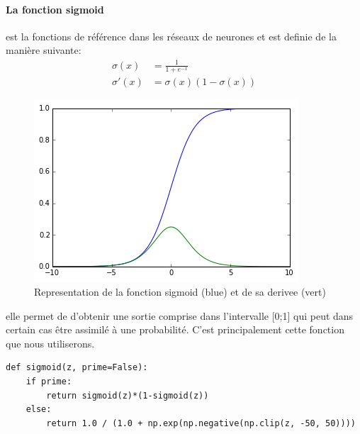 \documentclass[11pt]{article}
\begin{document}
\paragraph{La fonction sigmoid} est la fonctions de r\'ef\'erence dans les r\'eseaux de
neurones et est definie de la mani\`ere suivante: \\
\begin{equation}
	\begin{aligned}
		\sigma(x)  &= \frac{1}{1+e^{-x}} \\
		\sigma'(x) &= \sigma(x)(1-\sigma(x))
	\end{aligned}
\end{equation}
\begin{figure}[htp]
	\centering
	\includegraphics[scale=.5]{img/act_sigmoid.png}
	\caption{Representation de la fonction sigmoid (blue) et de sa derivee (vert)}
\end{figure}

elle permet de d'obtenir une sortie comprise dans l'intervalle [0;1] qui peut
dans certain cas \^etre assimil\'e \`a une probabilit\'e. C'est principalement
cette fonction que nous utiliserons.

\begin{lstlisting}
def sigmoid(z, prime=False):
    if prime:
		return sigmoid(z)*(1-sigmoid(z))
	else:
		return 1.0 / (1.0 + np.exp(np.negative(np.clip(z, -50, 50))))
\end{lstlisting}

\newpage
\end{document}
